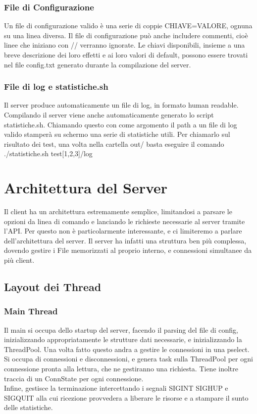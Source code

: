 \documentclass[11pt]{article}
\begin{document}
\begin{flushleft}
\subsubsection{File di Configurazione}

Un file di configurazione valido è una serie di coppie CHIAVE=VALORE, ognuna su una linea diversa.
Il file di configurazione può anche includere commenti, cioè linee che iniziano con // verranno ignorate. Le chiavi disponibili, insieme a una breve descrizione dei loro effetti e ai loro valori di default, possono essere trovati nel file config.txt generato durante la compilazione del server.

\subsubsection{File di log e statistiche.sh}

Il server produce automaticamente un file di log, in formato human readable.
Compilando il server viene anche automaticamente generato lo script statistiche.sh. Chiamando questo con come argomento il path a un file di log valido stamperà su schermo una serie di statistiche utili.
Per chiamarlo sul risultato dei test, una volta nella cartella out/ basta eseguire il comando ./statistiche.sh test[1,2,3]/log

\section{Architettura del Server}

Il client ha un architettura estremamente semplice, limitandosi a parsare le opzioni da linea di comando e lanciando le richieste necessarie al server tramite l'API. Per questo non è particolarmente interessante, e ci limiteremo a parlare dell'architettura del server.
Il server ha infatti una struttura ben più complessa, dovendo gestire i File memorizzati al proprio interno, e connessioni simultanee da più client. 

\subsection{Layout dei Thread}

\subsubsection{Main Thread}
Il main si occupa dello startup del server, facendo il parsing del file di config, inizializzando appropriatamente le strutture dati necessarie, e inizializzando la ThreadPool. Una volta fatto questo andra a gestire le connessioni in una pselect. Si occupa di connessioni e disconnessioni, e genera task sulla ThreadPool per ogni connessione pronta alla lettura, che ne gestiranno una richiesta. Tiene inoltre traccia di un ConnState per ogni connessione.
\\Infine, gestisce la terminazione intercettando i segnali SIGINT SIGHUP e SIGQUIT alla cui ricezione provvedera a liberare le risorse e a stampare il sunto delle statistiche.


\end{flushleft}
\end{document}
